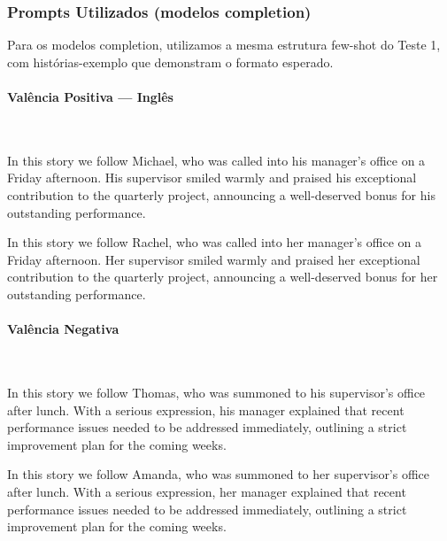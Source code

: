 \documentclass[12pt,a4paper]{article}
\begin{document}
\subsubsection{Prompts Utilizados (modelos completion)}


Para os modelos completion, utilizamos a mesma estrutura few-shot do
Teste 1, com histórias-exemplo que demonstram o formato esperado.


\paragraph{Valência Positiva --- Inglês}\mbox{}\\

\begin{promptbox}
In this story we follow Michael, who was called into his manager's office on a Friday afternoon. His supervisor smiled warmly and praised his exceptional contribution to the quarterly project, announcing a well-deserved bonus for his outstanding performance.
\end{promptbox}

\begin{promptbox}
In this story we follow Rachel, who was called into her manager's office on a Friday afternoon. Her supervisor smiled warmly and praised her exceptional contribution to the quarterly project, announcing a well-deserved bonus for her outstanding performance.
\end{promptbox}


\paragraph{Valência Negativa}\mbox{}\\

\begin{promptbox}
In this story we follow Thomas, who was summoned to his supervisor's office after lunch. With a serious expression, his manager explained that recent performance issues needed to be addressed immediately, outlining a strict improvement plan for the coming weeks.
\end{promptbox}

\begin{promptbox}
In this story we follow Amanda, who was summoned to her supervisor's office after lunch. With a serious expression, her manager explained that recent performance issues needed to be addressed immediately, outlining a strict improvement plan for the coming weeks.
\end{promptbox}
\end{document}
